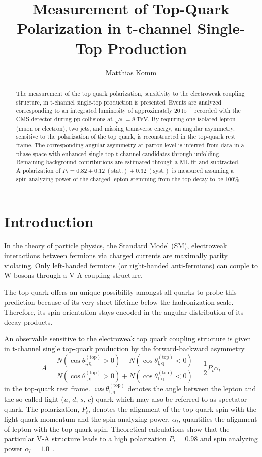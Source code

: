 \documentclass[a4paper]{jpconf}
\newcommand{\unit}[1]{\ensuremath{\mathrm{~#1}}}
\newcommand{\particle}[1]{\ensuremath{#1}}
\newcommand{\costheta}[0]{\cos\theta_{\mathrm{l,q}}^{\mathrm{(top)}}}
\begin{document}
\title{Measurement of Top-Quark Polarization in t-channel Single-Top Production}

\author{Matthias Komm}

\address{Centre for Cosmology, Particle Physics and Phenomenology, Universit\'e catholique de Louvain, 1348 Louvain-la-Neuve, Belgium}


\begin{abstract}
The measurement of the top quark polarization, sensitivity to the electroweak coupling structure, in t-channel single-top production is presented. Events are analyzed corresponding to an integrated luminosity of approximately $20\unit{fb^{-1}}$ recorded with the CMS detector during pp collisions at $\sqrt{s}=8\unit{TeV}$. By requiring one isolated lepton (muon or electron), two jets, and missing transverse energy, an angular asymmetry, sensitive to the  polarization of the top quark, is reconstructed in the top-quark rest frame. The corresponding angular asymmetry at parton level is inferred from data in a phase space with enhanced single-top t-channel candidates through unfolding. Remaining background contributions are estimated through a ML-fit and subtracted. A polarization of $P_{t}=0.82\pm0.12\mathrm{~(stat.)}\pm0.32\mathrm{~(syst.)}$ is measured assuming a spin-analyzing power of the charged lepton stemming from the top decay to be $100\%$.
\end{abstract}

\section{Introduction}
In the theory of particle physics, the Standard Model (SM), electroweak interactions between fermions via charged currents are maximally parity violating. Only left-handed fermions (or right-handed anti-fermions) can couple to W-bosons through a V-A coupling structure.


The top quark offers an unique possibility amongst all quarks to probe this prediction because of its very short lifetime below the hadronization scale. Therefore, its spin orientation stays encoded in the angular distribution of its decay products.


An observable sensitive to the electroweak top quark coupling structure is given in t-channel single top-quark production by the forward-backward asymmetry
\begin{equation}
A=\frac{N(\costheta>0)-N(\costheta<0)}{N(\costheta>0)+N(\costheta<0)}=\frac{1}{2}P_{t}\alpha_{l}
\end{equation}
in the top-quark rest frame. $\costheta$ denotes the angle between the lepton and the so-called light ($\particle{u}$, $\particle{d}$, $\particle{s}$, $\particle{c}$) quark which may also be referred to as spectator quark. The polarization, $P_{t}$, denotes the alignment of the top-quark spin with the light-quark momentum and the spin-analyzing power, $\alpha_{l}$, quantifies the alignment of lepton with the top-quark spin. Theoretical calculations show that the particular V-A structure leads to a high polarization $P_{t}=0.98$ and spin analyzing power $\alpha_{l}=1.0$~\cite{bernreuther}.
\end{document}
